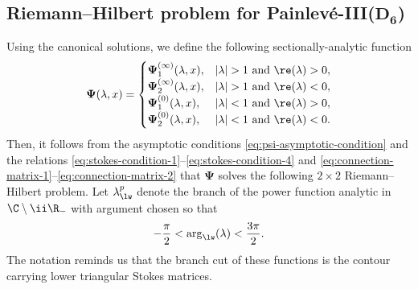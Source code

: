 \subsection[Riemann--Hilbert problem for Painlev\'e-III(D\_6)]{Riemann--Hilbert problem for Painlev\'e-III($\boldsymbol{D_6}$)} \label{sec:initial-rhp}
Using the canonical solutions, we define the following sectionally-analytic function
\[
\mathbf{\Psi}(\lambda, x) = \begin{cases}
\mathbf \Psi ^{(\infty)}_1(\lambda, x), & |\lambda| >1 \ \text{and} \ \re (\lambda) > 0, \\
\mathbf \Psi ^{(\infty)}_2(\lambda, x), & |\lambda| >1 \ \text{and} \ \re (\lambda) < 0, \\
\mathbf \Psi ^{(0)}_1(\lambda, x), & |\lambda| <1 \ \text{and} \ \re (\lambda) > 0, \\
\mathbf \Psi ^{(0)}_2(\lambda, x), & |\lambda| <1 \ \text{and} \ \re (\lambda) < 0. \\
\end{cases}
\]
Then, it follows from the asymptotic conditions \eqref{eq:psi-asymptotic-condition} and the relations \eqref{eq:stokes-condition-1}--\eqref{eq:stokes-condition-4} and \eqref{eq:connection-matrix-1}--\eqref{eq:connection-matrix-2} that $\mathbf{\Psi}$ solves the following $2 \times 2$ Riemann--Hilbert problem.
Let $\lambda_{\lw}^p$ denote the branch of the power function analytic in $\C\setminus \ii \R_-$ with argument chosen so that
\begin{equation}
-\dfrac{\pi}{2} < \mathrm{arg}_{\lw}(\lambda) < \dfrac{3\pi}{2}.
\label{eq:lw-branch-x-real}
\end{equation}
The notation reminds us that the branch cut of these functions is the contour carrying lower triangular Stokes matrices.
